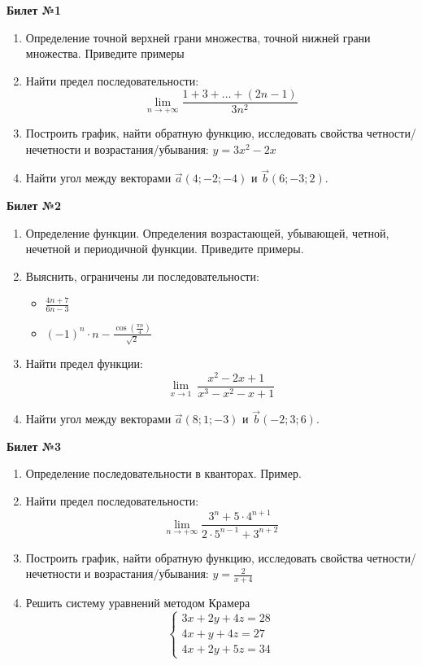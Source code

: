 \documentclass[a4paper, 12pt]{article}
\begin{document}
\begin{center}
    \textbf{Билет №1}
\end{center}
\begin{enumerate}
\item Определение точной верхней грани множества, точной нижней грани множества. Приведите примеры
\item Найти предел последовательности: \[\lim \limits_{n \to +\infty} \frac{1 + 3 + \dots + (2n - 1)}{3n^2}\]
\item Построить график, найти обратную функцию, исследовать свойства четности/нечетности и возрастания/убывания:
$y = 3x^2 - 2x$
\item Найти угол между векторами $\overrightarrow{a}(4; -2; -4)$ и $\overrightarrow{b}(6; -3; 2)$.
\end{enumerate}


\begin{center}
    \textbf{Билет №2}
\end{center}
\begin{enumerate}
\item Определение функции. Определения возрастающей, убывающей, четной, нечетной и периодичной функции. Приведите примеры.
\item Выяснить, ограничены ли последовательности:
\begin{itemize}
    \item \(\displaystyle \frac{4n+7}{6n-3}\)
    \item \((-1)^n \cdot n - \displaystyle \frac{\cos \left ( \displaystyle \frac{\pi n}{4} \right )}{\sqrt 2}\)
\end{itemize}
\item Найти предел функции:
\[\lim \limits_{x \to 1}\ \frac{x^2 - 2x + 1}{x^3 - x^2 - x + 1}\]
\item Найти угол между векторами $\overrightarrow{a}(8; 1; -3)$ и $\overrightarrow{b}(-2; 3; 6)$.
\end{enumerate}

\begin{center}
    \textbf{Билет №3}
\end{center}
\begin{enumerate}
\item Определение последовательности в кванторах. Пример.
\item Найти предел последовательности: \[\lim \limits_{n \to +\infty} \frac{3^n + 5 \cdot 4^{n+1}}{2 \cdot 5^{n-1} + 3^{n+2}}\]
\item Построить график, найти обратную функцию, исследовать свойства четности/нечетности и возрастания/убывания:
$y = \displaystyle \frac{2}{x+4}$
\item Решить систему уравнений методом Крамера
\[
	\begin{cases}
		3x + 2y + 4z = 28 \\
		4x + y + 4z = 27 \\
		4x + 2y + 5z = 34
	\end{cases}
\]
\end{enumerate}
\end{document}
